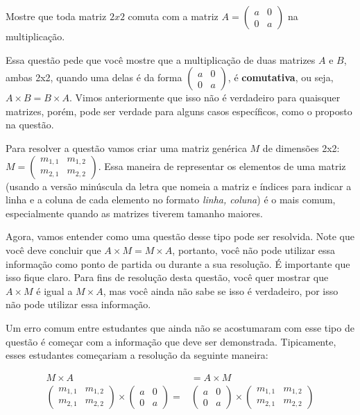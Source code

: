 \documentclass[main.tex]{subfiles}
\begin{document}
\begin{resolvida}
Mostre que toda matriz $2x2$ comuta com a matriz $A=\begin{pmatrix}a & 0 \\ 0 & a\end{pmatrix}$ na multiplicação.
\end{resolvida}


Essa questão pede que você mostre que a multiplicação de duas matrizes $A$ e $B$, ambas 2x2, quando uma delas é da forma $\begin{pmatrix}a & 0 \\ 0 & a\end{pmatrix}$, é \textbf{comutativa}, ou seja, $A \times B = B \times A$. Vimos anteriormente que isso não é verdadeiro para quaisquer matrizes, porém, pode ser verdade para alguns casos específicos, como o proposto na questão.

Para resolver a questão vamos criar uma matriz genérica $M$ de dimensões 2x2: $M = \begin{pmatrix}m_{1,1} & m_{1,2} \\ m_{2,1} & m_{2,2}\end{pmatrix}$. Essa maneira de representar os elementos de uma matriz (usando a versão minúscula da letra que nomeia a matriz e índices para indicar a linha e a coluna de cada elemento no formato {\it linha, coluna}) é o mais comum, especialmente quando as matrizes tiverem tamanho maiores.

Agora, vamos entender como uma questão desse tipo pode ser resolvida. Note que você deve concluir que $A \times M = M \times A$, portanto, você não pode utilizar essa informação como ponto de partida ou durante a sua resolução. É importante que isso fique claro. Para fins de resolução desta questão, você quer mostrar que $A \times M$ é igual a $M \times A$, mas você ainda não sabe se isso é verdadeiro, por isso não pode utilizar essa informação.

Um erro comum entre estudantes que ainda não se acostumaram com esse tipo de questão é começar com a informação que deve ser demonstrada. Tipicamente, esses estudantes começariam a resolução da seguinte maneira:

\begin{equation*}\begin{align}
M \times A & = A \times M  \\
\begin{pmatrix}m_{1,1} & m_{1,2} \\ m_{2,1} & m_{2,2}\end{pmatrix} \times \begin{pmatrix}a & 0 \\ 0 & a\end{pmatrix} = {} & \begin{pmatrix}a & 0 \\ 0 & a\end{pmatrix} \times \begin{pmatrix}m_{1,1} & m_{1,2} \\ m_{2,1} & m_{2,2}\end{pmatrix}
\end{align}\end{equation*}
\end{document}
